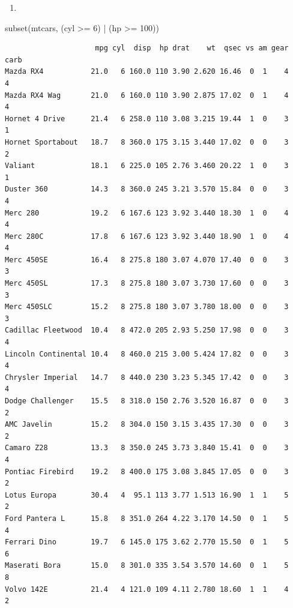 \documentclass[
  letterpaper,
  DIV=11,
  numbers=noendperiod]{scrreprt}
\newenvironment{Shaded}{\begin{snugshade}}{\end{snugshade}}
\newcommand{\DecValTok}[1]{\textcolor[rgb]{0.68,0.00,0.00}{#1}}
\newcommand{\FunctionTok}[1]{\textcolor[rgb]{0.28,0.35,0.67}{#1}}
\newcommand{\NormalTok}[1]{\textcolor[rgb]{0.00,0.23,0.31}{#1}}
\newcommand{\SpecialCharTok}[1]{\textcolor[rgb]{0.37,0.37,0.37}{#1}}
\providecommand{\tightlist}{%
  \setlength{\itemsep}{0pt}\setlength{\parskip}{0pt}}\usepackage{longtable,booktabs,array}
\begin{document}
\begin{enumerate}
\def\labelenumi{\alph{enumi})}
\setcounter{enumi}{5}
\tightlist
\item
\end{enumerate}

\begin{Shaded}
\begin{Highlighting}[]
\FunctionTok{subset}\NormalTok{(mtcars, (cyl }\SpecialCharTok{\textgreater{}=} \DecValTok{6}\NormalTok{) }\SpecialCharTok{|}\NormalTok{ (hp }\SpecialCharTok{\textgreater{}=} \DecValTok{100}\NormalTok{))}
\end{Highlighting}
\end{Shaded}

\begin{verbatim}
                     mpg cyl  disp  hp drat    wt  qsec vs am gear carb
Mazda RX4           21.0   6 160.0 110 3.90 2.620 16.46  0  1    4    4
Mazda RX4 Wag       21.0   6 160.0 110 3.90 2.875 17.02  0  1    4    4
Hornet 4 Drive      21.4   6 258.0 110 3.08 3.215 19.44  1  0    3    1
Hornet Sportabout   18.7   8 360.0 175 3.15 3.440 17.02  0  0    3    2
Valiant             18.1   6 225.0 105 2.76 3.460 20.22  1  0    3    1
Duster 360          14.3   8 360.0 245 3.21 3.570 15.84  0  0    3    4
Merc 280            19.2   6 167.6 123 3.92 3.440 18.30  1  0    4    4
Merc 280C           17.8   6 167.6 123 3.92 3.440 18.90  1  0    4    4
Merc 450SE          16.4   8 275.8 180 3.07 4.070 17.40  0  0    3    3
Merc 450SL          17.3   8 275.8 180 3.07 3.730 17.60  0  0    3    3
Merc 450SLC         15.2   8 275.8 180 3.07 3.780 18.00  0  0    3    3
Cadillac Fleetwood  10.4   8 472.0 205 2.93 5.250 17.98  0  0    3    4
Lincoln Continental 10.4   8 460.0 215 3.00 5.424 17.82  0  0    3    4
Chrysler Imperial   14.7   8 440.0 230 3.23 5.345 17.42  0  0    3    4
Dodge Challenger    15.5   8 318.0 150 2.76 3.520 16.87  0  0    3    2
AMC Javelin         15.2   8 304.0 150 3.15 3.435 17.30  0  0    3    2
Camaro Z28          13.3   8 350.0 245 3.73 3.840 15.41  0  0    3    4
Pontiac Firebird    19.2   8 400.0 175 3.08 3.845 17.05  0  0    3    2
Lotus Europa        30.4   4  95.1 113 3.77 1.513 16.90  1  1    5    2
Ford Pantera L      15.8   8 351.0 264 4.22 3.170 14.50  0  1    5    4
Ferrari Dino        19.7   6 145.0 175 3.62 2.770 15.50  0  1    5    6
Maserati Bora       15.0   8 301.0 335 3.54 3.570 14.60  0  1    5    8
Volvo 142E          21.4   4 121.0 109 4.11 2.780 18.60  1  1    4    2
\end{verbatim}
\end{document}
